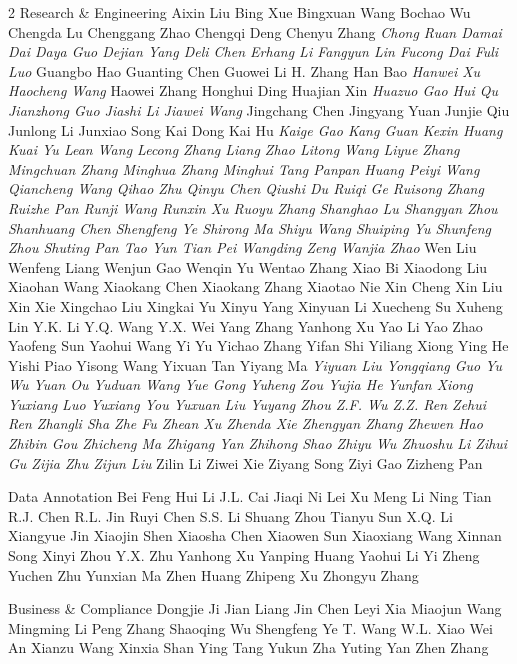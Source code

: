 \documentclass[11pt,a4paper]{article}
\begin{document}
2 Research \& Engineering 
 Aixin Liu 
 Bing Xue 
 Bingxuan Wang 
 Bochao Wu 
 Chengda Lu 
 Chenggang Zhao 
 Chengqi Deng 
 Chenyu Zhang\textit{ 
 Chong Ruan 
 Damai Dai 
 Daya Guo 
 Dejian Yang 
 Deli Chen 
 Erhang Li 
 Fangyun Lin 
 Fucong Dai 
 Fuli Luo} 
 Guangbo Hao 
 Guanting Chen 
 Guowei Li 
 H. Zhang 
 Han Bao\textit{ 
 Hanwei Xu 
 Haocheng Wang} 
 Haowei Zhang 
 Honghui Ding 
 Huajian Xin\textit{ 
 Huazuo Gao 
 Hui Qu 
 Jianzhong Guo 
 Jiashi Li 
 Jiawei Wang} 
 Jingchang Chen 
 Jingyang Yuan 
 Junjie Qiu 
 Junlong Li 
 Junxiao Song 
 Kai Dong 
 Kai Hu\textit{ 
 Kaige Gao 
 Kang Guan 
 Kexin Huang 
 Kuai Yu 
 Lean Wang 
 Lecong Zhang 
 Liang Zhao 
 Litong Wang 
 Liyue Zhang 
 Mingchuan Zhang 
 Minghua Zhang 
 Minghui Tang 
 Panpan Huang 
 Peiyi Wang 
 Qiancheng Wang 
 Qihao Zhu 
 Qinyu Chen 
 Qiushi Du 
 Ruiqi Ge 
 Ruisong Zhang 
 Ruizhe Pan 
 Runji Wang 
 Runxin Xu 
 Ruoyu Zhang 
 Shanghao Lu 
 Shangyan Zhou 
 Shanhuang Chen 
 Shengfeng Ye 
 Shirong Ma 
 Shiyu Wang 
 Shuiping Yu 
 Shunfeng Zhou 
 Shuting Pan 
 Tao Yun 
 Tian Pei 
 Wangding Zeng 
 Wanjia Zhao} 
 Wen Liu 
 Wenfeng Liang 
 Wenjun Gao 
 Wenqin Yu 
 Wentao Zhang 
 Xiao Bi 
 Xiaodong Liu 
 Xiaohan Wang 
 Xiaokang Chen 
 Xiaokang Zhang 
 Xiaotao Nie 
 Xin Cheng 
 Xin Liu 
 Xin Xie 
 Xingchao Liu 
 Xingkai Yu 
 Xinyu Yang 
 Xinyuan Li 
 Xuecheng Su 
 Xuheng Lin 
 Y.K. Li 
 Y.Q. Wang 
 Y.X. Wei 
 Yang Zhang 
 Yanhong Xu 
 Yao Li 
 Yao Zhao 
 Yaofeng Sun 
 Yaohui Wang 
 Yi Yu 
 Yichao Zhang 
 Yifan Shi 
 Yiliang Xiong 
 Ying He 
 Yishi Piao 
 Yisong Wang 
 Yixuan Tan 
 Yiyang Ma\textit{ 
 Yiyuan Liu 
 Yongqiang Guo 
 Yu Wu 
 Yuan Ou 
 Yuduan Wang 
 Yue Gong 
 Yuheng Zou 
 Yujia He 
 Yunfan Xiong 
 Yuxiang Luo 
 Yuxiang You 
 Yuxuan Liu 
 Yuyang Zhou 
 Z.F. Wu 
 Z.Z. Ren 
 Zehui Ren 
 Zhangli Sha 
 Zhe Fu 
 Zhean Xu 
 Zhenda Xie 
 Zhengyan Zhang 
 Zhewen Hao 
 Zhibin Gou 
 Zhicheng Ma 
 Zhigang Yan 
 Zhihong Shao 
 Zhiyu Wu 
 Zhuoshu Li 
 Zihui Gu 
 Zijia Zhu 
 Zijun Liu} 
 Zilin Li 
 Ziwei Xie 
 Ziyang Song 
 Ziyi Gao 
 Zizheng Pan

Data Annotation 
 Bei Feng 
 Hui Li 
 J.L. Cai 
 Jiaqi Ni 
 Lei Xu 
 Meng Li 
 Ning Tian 
 R.J. Chen 
 R.L. Jin 
 Ruyi Chen 
 S.S. Li 
 Shuang Zhou 
 Tianyu Sun 
 X.Q. Li 
 Xiangyue Jin 
 Xiaojin Shen 
 Xiaosha Chen 
 Xiaowen Sun 
 Xiaoxiang Wang 
 Xinnan Song 
 Xinyi Zhou 
 Y.X. Zhu 
 Yanhong Xu 
 Yanping Huang 
 Yaohui Li 
 Yi Zheng 
 Yuchen Zhu 
 Yunxian Ma 
 Zhen Huang 
 Zhipeng Xu 
 Zhongyu Zhang

Business \& Compliance 
 Dongjie Ji 
 Jian Liang 
 Jin Chen 
 Leyi Xia 
 Miaojun Wang 
 Mingming Li 
 Peng Zhang 
 Shaoqing Wu 
 Shengfeng Ye 
 T. Wang 
 W.L. Xiao 
 Wei An 
 Xianzu Wang 
 Xinxia Shan 
 Ying Tang 
 Yukun Zha 
 Yuting Yan 
 Zhen Zhang
\end{document}
